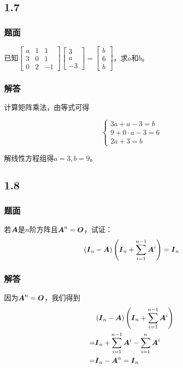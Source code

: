 \documentclass[9pt,xcolor=svgnames]{beamer} %
\begin{document}
\subsection*{1.7}
\begin{frame}
    \frametitle{题面}
    已知\(\begin{bmatrix}a&1&1\\3&0&1\\0&2&-1\end{bmatrix}\begin{bmatrix}3\\a\\-3\end{bmatrix}=\begin{bmatrix}b\\6\\b\end{bmatrix}\)，求\(a\)和\(b\)。
\end{frame}
\begin{frame}
    \frametitle{解答}
    计算矩阵乘法，由等式可得

    \begin{equation*}
        \begin{cases}
            3a+a-3=b       \\
            9+0\cdot a-3=6 \\
            2a+3=b
        \end{cases}
    \end{equation*}

    解线性方程组得\(a=3,b=9\)。
\end{frame}

\subsection*{1.8}
\begin{frame}
    \frametitle{题面}
    若\(\boldsymbol{A}\)是\(n\)阶方阵且\(\boldsymbol{A}^n=\boldsymbol{O}\)，试证：
    \begin{equation*}
        \left( \boldsymbol{I}_n-\boldsymbol{A} \right)\left( \boldsymbol{I}_n+\sum_{i=1}^{n-1}\boldsymbol{A}^i \right)=\boldsymbol{I}_n
    \end{equation*}
\end{frame}
\begin{frame}
    \frametitle{解答}
    因为\(\boldsymbol{A}^n=\boldsymbol{O}\)，我们得到
    \begin{align*}
          & \left( \boldsymbol{I}_n-\boldsymbol{A} \right)\left( \boldsymbol{I}_n+\sum_{i=1}^{n-1}\boldsymbol{A}^i \right) \\
        = & \boldsymbol{I}_n+\sum_{i=1}^{n-1}\boldsymbol{A}^i-\sum_{i=1}^n\boldsymbol{A}^i        \\
        = & \boldsymbol{I}_n-\boldsymbol{A}^n=\boldsymbol{I}_n
    \end{align*}
\end{frame}
\end{document}
